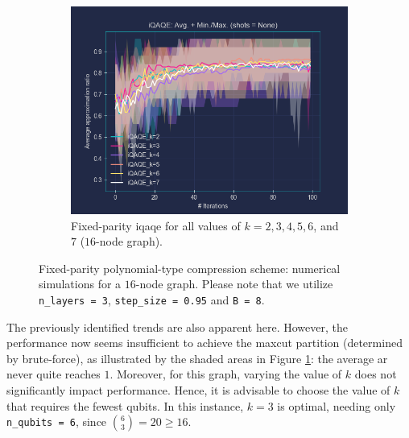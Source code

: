\clearpage

\begin{figure}[ht!]
  \addtocounter{figure}{-1} %
  \centering
  \begin{subfigure}[b]{\textwidth}
      \addtocounter{subfigure}{2} %
      \centering
      \includegraphics[width=1\textwidth]{Figures/Chapter_5/Fixed-parity/All_k's(16-node).png}
      \caption{Fixed-parity \acrshort{iqaqe} for all values of $k = 2, 3, 4, 5, 6$, and $7$ ($16$-node graph).}
      \label{fig:All_k's(16_node)}
  \end{subfigure}
  \caption{Fixed-parity polynomial-type compression scheme: numerical simulations for a $16$-node graph. Please note that we utilize \texttt{n\_layers = 3}, \texttt{step\_size = 0.95} and \texttt{B = 8}.}
  \label{fig:Fixed-parity(16_node)}
\end{figure}

The previously identified trends are also apparent here. However, the performance now seems insufficient to achieve the \acrshort{maxcut} partition (determined by brute-force), as illustrated by the shaded areas in Figure \ref{fig:All_k's(16_node)}: the average \acrshort{ar} never quite reaches $1$. Moreover, for this graph, varying the value of $k$ does not significantly impact performance. Hence, it is advisable to choose the value of $k$ that requires the fewest qubits. In this instance, $k=3$ is optimal, needing only \texttt{n\_qubits = 6}, since $\binom{6}{3} = 20 \geq 16$.


